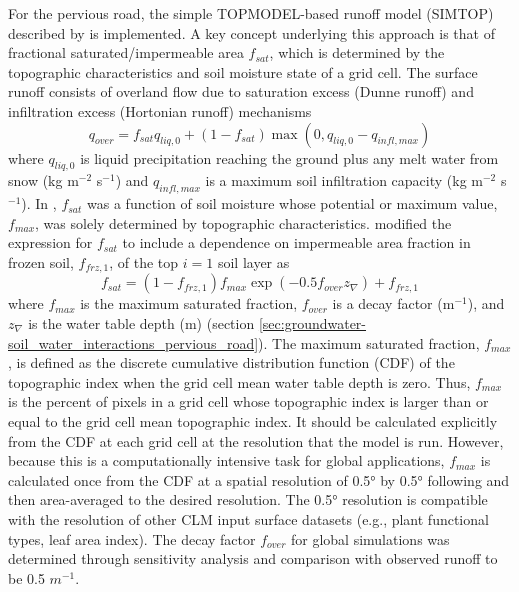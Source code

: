 \documentclass[12pt,authoryear]{elsarticle}
\numberwithin{equation}{section} %
\begin{document}
For the pervious road, the simple TOPMODEL-based \citep{bevenPhysicallyBasedVariable1979} runoff model (SIMTOP) described by \citep{niuSimpleTOPMODELbasedRunoff2005} is implemented. A key concept underlying this approach is that of fractional saturated/impermeable area $f_{sat}$, which is determined by the topographic characteristics and soil moisture state of a grid cell. The surface runoff consists of overland flow due to saturation excess (Dunne runoff) and infiltration excess (Hortonian runoff) mechanisms
\begin{equation}
\label{eq:overland_flow}
q_{over} = f_{sat}q_{liq,0} +(1-f_{sat})\max(0,q_{liq,0}-q_{infl,max})
\end{equation}
where $q_{liq,0}$ is liquid precipitation reaching the ground plus any melt water from snow (kg m$^{-2}$ s$^{-1}$) and $q_{infl,max}$ is a maximum soil infiltration capacity (kg m$^{-2}$ s$^{-1}$). In \cite{niuSimpleTOPMODELbasedRunoff2005}, $f_{sat}$ was a function of soil moisture whose potential or maximum value, $f_{max}$, was solely determined by topographic characteristics. \citep{niuEffectsFrozenSoil2006} modified the
expression for $f_{sat}$ to include a dependence on impermeable area fraction in frozen soil, $f_{frz,1}$, of the top $i=1$ soil layer as
\begin{equation}
f_{sat} = (1-f_{frz,1})f_{max}\exp(-0.5f_{over}z_{\nabla})+f_{frz,1}
\end{equation}
where $f_{max}$ is the maximum saturated fraction, $f_{over}$ is a decay factor (m$^{-1}$), and $z_{\nabla}$ is the water table depth (m) (section \ref{sec:groundwater-soil_water_interactions_pervious_road}). The maximum saturated fraction, $f_{max}$, is defined as the discrete cumulative distribution function (CDF) of the topographic index when the
grid cell mean water table depth is zero. Thus, $f_{max}$ is the percent of pixels in a grid cell whose topographic index is larger than or equal to the grid cell mean topographic index. It should be calculated explicitly from the CDF at each grid cell at the resolution that the model is run. However, because this is a computationally intensive task for global applications, $f_{max}$ is calculated once from the CDF at a spatial resolution of 0.5° by 0.5° following \cite{niuSimpleTOPMODELbasedRunoff2005} and then area-averaged to the desired resolution. The 0.5° resolution is compatible with the resolution of other CLM input surface datasets (e.g., plant functional types, leaf area index). The decay factor $f_{over}$ for global simulations was determined through sensitivity analysis and comparison with observed runoff to be 0.5 $m^{-1}$. 
\end{document}

